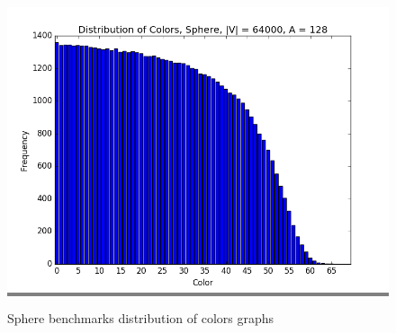 \documentclass{article}
\begin{document}
\begin{figure}
\begin{minipage}{0.45\textwidth}
    \colorbox{gray}{\includegraphics[width=\linewidth]{./graphs/hist_colors_sphere_2.png}}
    \end{minipage}

    \caption{Sphere benchmarks distribution of colors graphs}
    \label{spherecolorshists}
\end{figure}

\end{document}
